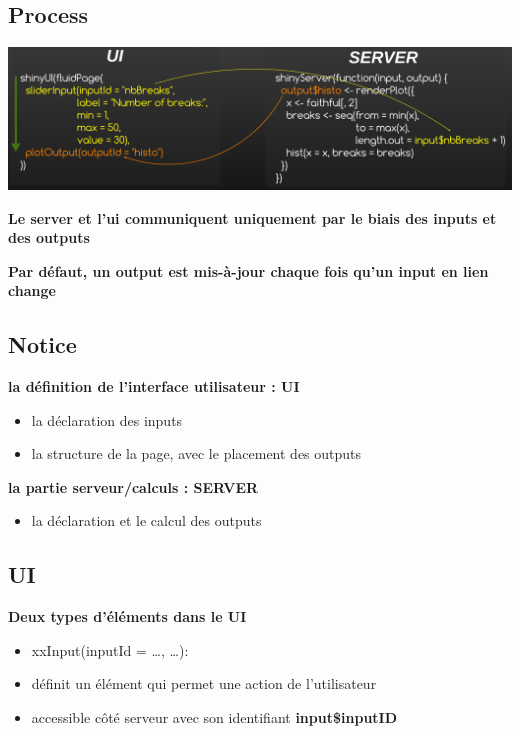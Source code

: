 \documentclass[]{article}
\providecommand{\tightlist}{%
  \setlength{\itemsep}{0pt}\setlength{\parskip}{0pt}}
\begin{document}
\subsection{Process}\label{process}

\includegraphics{img/shiny_process.png}

\textbf{Le server et l'ui communiquent uniquement par le biais des
inputs et des outputs}

\textbf{Par défaut, un output est mis-à-jour chaque fois qu'un input en
lien change}

\subsection{Notice}\label{notice}

\textbf{la définition de l'interface utilisateur : UI}

\begin{itemize}
\tightlist
\item
  la déclaration des inputs
\item
  la structure de la page, avec le placement des outputs
\end{itemize}

\textbf{la partie serveur/calculs : SERVER}

\begin{itemize}
\tightlist
\item
  la déclaration et le calcul des outputs
\end{itemize}

\subsection{UI}\label{ui}

\textbf{Deux types d'éléments dans le UI}

\begin{itemize}
\item
  xxInput(inputId = \ldots{}, \ldots{}):
\item
  définit un élément qui permet une action de l'utilisateur
\item
  accessible côté serveur avec son identifiant \textbf{input\$inputID}
\end{itemize}
\end{document}
